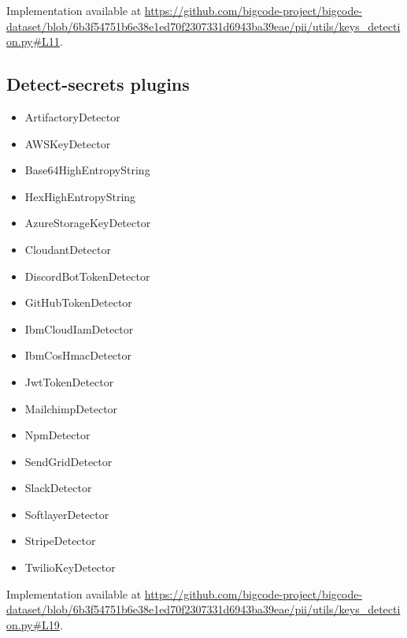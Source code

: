 \documentclass[10pt]{article} \usepackage{iclr2023_conference,times}
\begin{document}
Implementation available at \url{https://github.com/bigcode-project/bigcode-dataset/blob/6b3f54751b6e38e1ed70f2307331d6943ba39eae/pii/utils/keys_detection.py#L11}. 

\subsection{Detect-secrets plugins}\label{sec:detect-secrets-plugins}

\begin{itemize}
\item ArtifactoryDetector
\item AWSKeyDetector
\item Base64HighEntropyString
\item HexHighEntropyString
\item AzureStorageKeyDetector
\item CloudantDetector
\item DiscordBotTokenDetector
\item GitHubTokenDetector
\item IbmCloudIamDetector
\item IbmCosHmacDetector
\item JwtTokenDetector
\item MailchimpDetector
\item NpmDetector
\item SendGridDetector
\item SlackDetector
\item SoftlayerDetector
\item StripeDetector
\item TwilioKeyDetector
\end{itemize}
Implementation available at \url{https://github.com/bigcode-project/bigcode-dataset/blob/6b3f54751b6e38e1ed70f2307331d6943ba39eae/pii/utils/keys_detection.py#L19}. 
\end{document}
